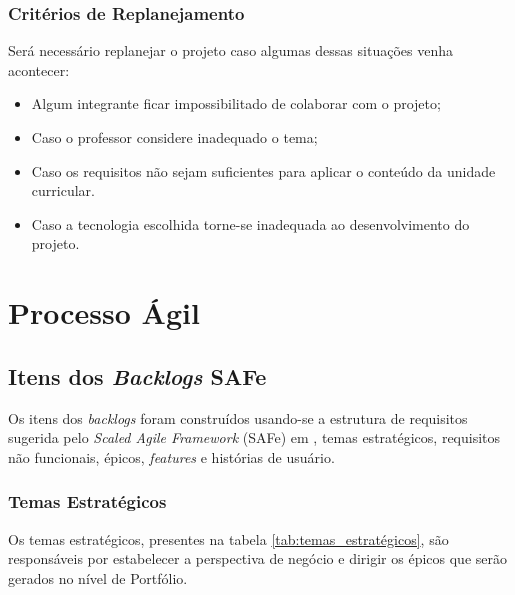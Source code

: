 \documentclass[
	12pt,				%
	oneside,			%
	a4paper,			%
	english,			%
	brazil,				%
	]{abntex2}
\begin{document}
\section{Critérios de Replanejamento}
Será necessário replanejar o projeto caso algumas dessas situações venha acontecer:
\begin{itemize}
    \item Algum integrante ficar impossibilitado de colaborar com o projeto;
    \item Caso o professor considere inadequado o tema;
    \item Caso os requisitos não sejam suficientes para aplicar o conteúdo da unidade curricular.
    \item Caso a tecnologia escolhida torne-se inadequada ao desenvolvimento do projeto.
\end{itemize}

\part{Processo Ágil}

\chapter{Itens dos \textit{Backlogs} SAFe}
Os itens dos \textit{backlogs} foram construídos usando-se a estrutura de requisitos sugerida pelo \foreignlanguage{english}{\textit{Scaled Agile Framework}} (SAFe) em \cite{safe_requirements_model}, temas estratégicos, requisitos não funcionais, épicos, \textit{features} e histórias de usuário.

\section{Temas Estratégicos}
Os temas estratégicos, presentes na tabela \ref{tab:temas_estratégicos}, são responsáveis por estabelecer a perspectiva de negócio e dirigir os épicos que serão gerados no nível de Portfólio.

\begin{table}[ht]
\end{table}
\end{document}
